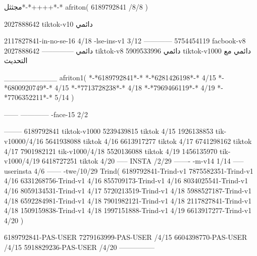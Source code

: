مجثثل*-*++++*-*
afriton(
6189792841 /8/8
)

2027888642 tiktok-v10
دائمي

2117827841-in-no-se-16 4/18
-lse-ins-v1 3/12
------------
5754454119 facbook-v8
دائمي
--------------
2027888642 tiktok-v8
دائمي
5909533996 tiktok-v1000
دائمي مع التحديث

__________
afriton1(
*-*6189792841*-*
*-*6281426198*-* 4/15
*-*6800920749*-* 4/15
*-*7713728238*-* 4/18
*-*7969466119*-* 4/19
*-*7706352211*-* 5/14
)


------
------------
-face-15 2/2

--------
6189792841 tiktok-v1000
5239439815 tiktok 4/15
1926138853 tik-v10000/4/16
5641938088 tiktok 4/16
6613917277 tiktok 4/17
6741298162 tiktok 4/17
7901982121 tik-v1000/4/18
5520136088 tiktok 4/19
1456135970 tik-v1000/4/19
6418727251 tiktok 4/20
-----
 INSTA /2/29
-------
-m-v14 1/14
-----
userinsta 4/6
------
-twe/10/29
Trind(
6189792841-Trind-v1 
7875582351-Trind-v1  4/16
6331268756-Trind-v1  4/16
855709173-Trind-v1  4/16
8034025541-Trind-v1  4/16
8059134531-Trind-v1  4/17
5720213519-Trind-v1  4/18
5988527187-Trind-v1  4/18
6592284981-Trind-v1  4/18
7901982121-Trind-v1  4/18
2117827841-Trind-v1  4/18
1509159838-Trind-v1  4/18
1997151888-Trind-v1  4/19
6613917277-Trind-v1  4/20
)

6189792841-PAS-USER
7279163999-PAS-USER /4/15
6604398770-PAS-USER /4/15
5918829236-PAS-USER /4/20
    ---------------

